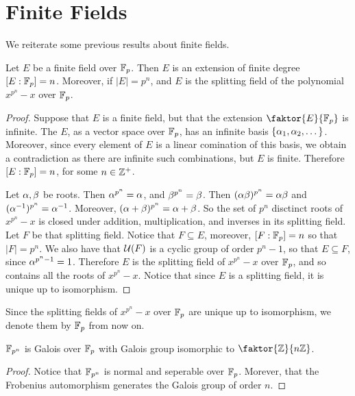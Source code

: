\section{Finite Fields}

We reiterate some previous results about finite fields.

\begin{lemma}\label{2.3.1}
    Let $E$ be a finite field over  $\mathbb{F}_p$. Then $E$ is an extension of finite
    degree $[E:\mathbb{F}_p]=n$. Moreover, if $|E|=p^n$, and $E$ is the splitting field
    of the polynomial $x^{p^n}-x$ over $\mathbb{F}_p$.
\end{lemma}

\begin{proof}
    Suppose that $E$ is a finite field, but that the extension
    $\faktor{E}{\F_p}$ is infinite. The $E$, as a vector space over  $\mathbb{F}_p$, has
    an infinite basis  $\{\alpha_1, \alpha_2, \dots\}$. Moreover, since every element of
    $E$ is a linear comination of this basis, we obtain a contradiction as there
    are infinite such combinations, but $E$ is finite. Therefore $[E:\mathbb{F}_p]=n$,
    for some $n \in \mathbb{Z}^+$.

    Let $\alpha,\beta$ be roots. Then  $\alpha^{p^n}=\alpha$, and $\beta^{p^n}=\beta$. Then
    $(\alpha\beta)^{p^n}=\alpha\beta$ and $(\alpha^{-1})^{p^n}=\alpha^{-1}$. Moreover,
    $(\alpha+\beta)^{p^n}=\alpha+\beta$. So the set of $p^n$ disctinct roots of  $x^{p^n}-x$
    is closed under addition, multiplication, and inverses in its splitting
    field. Let $F$ be that splitting field. Notice that  $F \subseteq E$,
    moreover, $[F:\mathbb{F}_p]=n$ so that $|F|=p^n$. We also have that
    $\mathcal{U}(F)$ is a cyclic group of order $p^n-1$, so that $E \subseteq F$,
    since $\alpha^{p^n-1}=1$. Therefore $E$ is the splitting field of
    $x^{p^n}-x$ over $\mathbb{F}_p$, and so contains all the roots of $x^{p^n}-x$.
    Notice that since $E$ is a splitting field, it is unique up to isomorphism.
\end{proof}
\begin{remark}
    Since the splitting fields of $x^{p^n}-x$ over $\mathbb{F}_p$ are unique up to
    isomorphism, we denote them by  $\mathbb{F}_p$ from now on.
\end{remark}
\begin{corollary}
    $\mathbb{F}_{p^n}$ is Galois over $\mathbb{F}_p$ with Galois group isomorphic to
    $\faktor{\Z}{n\Z}$.
\end{corollary}
\begin{proof}
    Notice that $\mathbb{F}_{p^n}$ is normal and seperable over $\mathbb{F}_p$. Morever, that
    the Frobenius automorphism generates the Galois group of order  $n$.
\end{proof}
